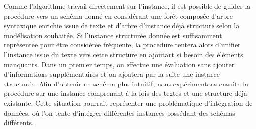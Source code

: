 Comme l'algorithme travail directement sur l'instance, il est possible de guider la procédure vers un schéma donné en considérant une forêt composée d'arbre syntaxique enrichie issue de texte et d'arbre d'instance déjà structuré selon la modélisation souhaitée.
Si l'instance structurée donnée est suffisamment représentée pour être considérée fréquente, la procédure tentera alors d'unifier l'instance issue du texte vers cette structure en ajoutant si besoin des éléments manquants.
Dans un premier temps, on effectue une évaluation sans ajouter d'informations supplémentaires et on ajoutera par la suite une instance structurée.
Afin d'obtenir un schéma plus intuitif, nous expérimentons ensuite la procédure sur une instance comprenant à la fois des textes et une structure déjà existante.
Cette situation pourrait représenter une problématique d'intégration de données, où l'on tente d'intégrer différentes instances possédant des schémas différents.

\FloatBarrier
